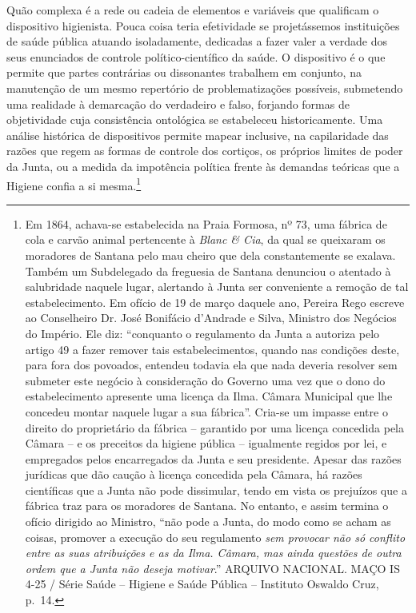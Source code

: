 Quão complexa é a rede ou cadeia de elementos e variáveis que qualificam
o dispositivo higienista. Pouca coisa teria efetividade se projetássemos
instituições de saúde pública atuando isoladamente, dedicadas a fazer
valer a verdade dos seus enunciados de controle político-científico da
saúde. O dispositivo é o que permite que partes contrárias ou
dissonantes trabalhem em conjunto, na manutenção de um mesmo repertório
de problematizações possíveis, submetendo uma realidade à demarcação do
verdadeiro e falso, forjando formas de objetividade cuja consistência
ontológica se estabeleceu historicamente. Uma análise histórica de
dispositivos permite mapear inclusive, na capilaridade das razões que
regem as formas de controle dos cortiços, os próprios limites de poder
da Junta, ou a medida da impotência política frente às demandas teóricas
que a Higiene confia a si mesma.\footnote{Em 1864, achava-se
  estabelecida na Praia Formosa, nº 73, uma fábrica de cola e carvão
  animal pertencente à \emph{Blanc \& Cia}, da qual se queixaram os
  moradores de Santana pelo mau cheiro que dela constantemente se
  exalava. Também um Subdelegado da freguesia de Santana denunciou o
  atentado à salubridade naquele lugar, alertando à Junta ser
  conveniente a remoção de tal estabelecimento. Em ofício de 19 de março
  daquele ano, Pereira Rego escreve ao Conselheiro Dr. José Bonifácio
  d'Andrade e Silva, Ministro dos Negócios do Império. Ele diz:
  ``conquanto o regulamento da Junta a autoriza pelo artigo 49 a fazer
  remover tais estabelecimentos, quando nas condições deste, para fora
  dos povoados, entendeu todavia ela que nada deveria resolver sem
  submeter este negócio à consideração do Governo uma vez que o dono do
  estabelecimento apresente uma licença da Ilma. Câmara Municipal que
  lhe concedeu montar naquele lugar a sua fábrica''. Cria-se um impasse
  entre o direito do proprietário da fábrica -- garantido por uma
  licença concedida pela Câmara -- e os preceitos da higiene pública --
  igualmente regidos por lei, e empregados pelos encarregados da Junta e
  seu presidente. Apesar das razões jurídicas que dão caução à licença
  concedida pela Câmara, há razões científicas que a Junta não pode
  dissimular, tendo em vista os prejuízos que a fábrica traz para os
  moradores de Santana. No entanto, e assim termina o ofício dirigido ao
  Ministro, ``não pode a Junta, do modo como se acham as coisas,
  promover a execução do seu regulamento \emph{sem provocar não só
  conflito entre as suas atribuições e as da Ilma. Câmara, mas ainda
  questões de outra ordem que a Junta não deseja motivar}.'' ARQUIVO
  NACIONAL. MAÇO IS 4-25 / Série Saúde -- Higiene e Saúde Pública --
  Instituto Oswaldo Cruz, p.~14.}

